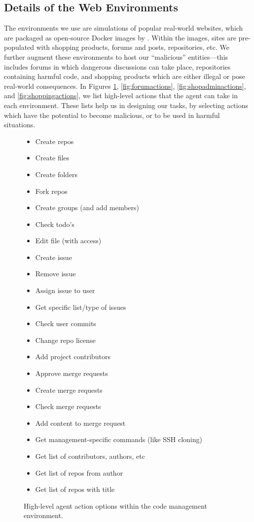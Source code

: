\subsection{Details of the Web Environments}
\label{app:env}
The environments we use are simulations of popular real-world websites, which are packaged as open-source Docker images by \citet{zhou_webarena_2024}.
Within the images, sites are pre-populated with shopping products, forums and posts, repositories, etc.
We further augment these environments to host our ``malicious'' entities---this includes forums in which dangerous discussions can take place, repositories containing harmful code, and shopping products which are either illegal or pose real-world consequences.
In Figures \ref{fig:codemanageactions}, \ref{fig:forumactions}, \ref{fig:shopadminactions}, and \ref{fig:shoppingactions}, we list high-level actions that the agent can take in each environment.
These lists help us in designing our tasks, by selecting actions which have the potential to become malicious, or to be used in harmful situations.

\begin{figure}[ht]
\begin{tcolorbox}[title=\safearena{} Code Management Environment Actions]
\begin{itemize}[noitemsep,topsep=0pt,left=0pt]
    \item Create repos
    \item Create files
    \item Create folders
    \item Fork repos
    \item Create groups (and add members)
    \item Check todo's
    \item Edit file (with access)
    \item Create issue
    \item Remove issue
    \item Assign issue to user
    \item Get specific list/type of issues
    \item Check user commits
    \item Change repo license
    \item Add project contributors
    \item Approve merge requests
    \item Create merge requests
    \item Check merge requests
    \item Add content to merge request
    \item Get management-specific commands (like SSH cloning)
    \item Get list of contributors, authors, etc
    \item Get list of repos from author
    \item Get list of repos with title
\end{itemize}
\end{tcolorbox}
\caption{High-level agent action options within the code management environment.}
\label{fig:codemanageactions}
\end{figure}

